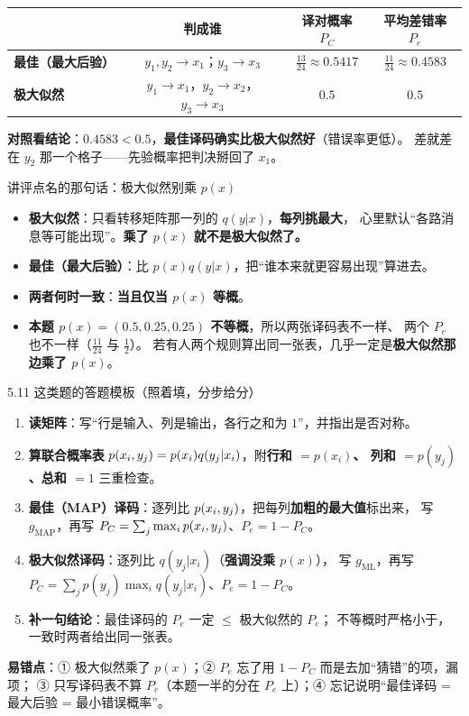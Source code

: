 \documentclass[11pt,a4paper]{ctexart}
\begin{document}
\begin{center}\small
\setlength{\tabcolsep}{5pt}
\begin{tabular}{@{}p{3.0cm}c|c|c@{}}
\toprule
& 判成谁 & 译对概率 $P_C$ & 平均差错率 $P_e$\\
\midrule
\textbf{最佳（最大后验）} & $y_1,y_2\to x_1$；$y_3\to x_3$ & $\frac{13}{24}\approx0.5417$ & $\frac{11}{24}\approx0.4583$\\[2pt]
\textbf{极大似然} & $y_1\to x_1$，$y_2\to x_2$，$y_3\to x_3$ & $0.5$ & $0.5$\\
\bottomrule
\end{tabular}
\end{center}

\textbf{对照看结论}：$0.4583<0.5$，\textbf{最佳译码确实比极大似然好}（错误率更低）。
差就差在 $y_2$ 那一个格子——先验概率把判决掰回了 $x_1$。

\begin{exam}{讲评点名的那句话：极大似然别乘 $p(x)$}
\begin{itemize}[leftmargin=1.8em,itemsep=2pt,topsep=2pt]
  \item \textbf{极大似然}：只看转移矩阵那一列的 $q(y|x)$，\textbf{每列挑最大}，
        心里默认“各路消息等可能出现”。\textbf{乘了 $p(x)$ 就不是极大似然了。}
  \item \textbf{最佳（最大后验）}：比 $p(x)q(y|x)$，把“谁本来就更容易出现”算进去。
  \item \textbf{两者何时一致}：\textbf{当且仅当 $p(x)$ 等概}。
  \item \textbf{本题 $p(x)=(0.5,0.25,0.25)$ 不等概}，所以两张译码表不一样、
        两个 $P_e$ 也不一样（$\frac{11}{24}$ 与 $\frac12$）。
        若有人两个规则算出同一张表，几乎一定是\textbf{极大似然那边乘了 $p(x)$}。
\end{itemize}
\end{exam}

\begin{exam}{5.11 这类题的答题模板（照着填，分步给分）}
\begin{enumerate}[leftmargin=1.8em,itemsep=1pt,topsep=2pt]
  \item \textbf{读矩阵}：写“行是输入、列是输出，各行之和为 $1$”，并指出是否对称。
  \item \textbf{算联合概率表} $p\!\left(x_i,y_j\right)=p(x_i)q(y_j|x_i)$，附\textbf{行和 $=p(x_i)$、
        列和 $=p(y_j)$、总和 $=1$} 三重检查。
  \item \textbf{最佳（MAP）译码}：逐列比 $p\!\left(x_i,y_j\right)$，把每列\textbf{加粗的最大值}标出来，
        写 $g_{\mathrm{MAP}}$，再写 $P_C=\sum_j\max_ip\!\left(x_i,y_j\right)$、$P_e=1-P_C$。
  \item \textbf{极大似然译码}：逐列比 $q(y_j|x_i)$（\textbf{强调没乘 $p(x)$}），
        写 $g_{\mathrm{ML}}$，再写 $P_C=\sum_j p(y_j)\max_i q(y_j|x_i)$、$P_e=1-P_C$。
  \item \textbf{补一句结论}：最佳译码的 $P_e$ 一定 $\le$ 极大似然的 $P_e$；
        不等概时严格小于，一致时两者给出同一张表。
\end{enumerate}
\textbf{易错点}：① 极大似然乘了 $p(x)$；② $P_e$ 忘了用 $1-P_C$ 而是去加“猜错”的项，漏项；
③ 只写译码表不算 $P_e$（本题一半的分在 $P_e$ 上）；④ 忘记说明“最佳译码 = 最大后验 = 最小错误概率”。
\end{exam}
\end{document}
